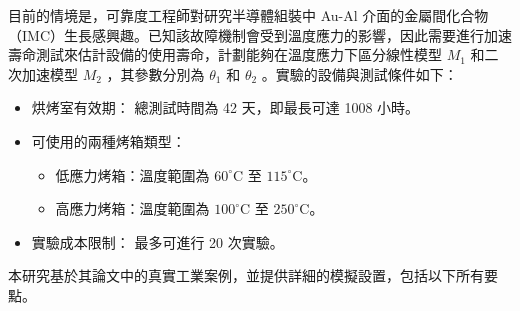 \hspace*{8mm} 目前的情境是，可靠度工程師對研究半導體組裝中 Au-Al 介面的金屬間化合物（IMC）生長感興趣。已知該故障機制會受到溫度應力的影響，因此需要進行加速壽命測試來估計設備的使用壽命，計劃能夠在溫度應力下區分線性模型 $M_1$ 和二次加速模型 $M_2$ ，其參數分別為 $\theta_1$ 和 $\theta_2$ 。實驗的設備與測試條件如下：

\begin{itemize}
\item 烘烤室有效期： 總測試時間為 42 天，即最長可達 1008 小時。

\item 可使用的兩種烤箱類型：

\begin{itemize}
\item 低應力烤箱：溫度範圍為 $60^{\circ}\text{C}$ 至 $115^{\circ}\text{C}$。
\item 高應力烤箱：溫度範圍為 $100^{\circ}\text{C}$ 至 $250^{\circ}\text{C}$。
\end{itemize}

\item 實驗成本限制： 最多可進行 20 次實驗。

\end{itemize}

本研究基於其論文中的真實工業案例，並提供詳細的模擬設置，包括以下所有要點。

